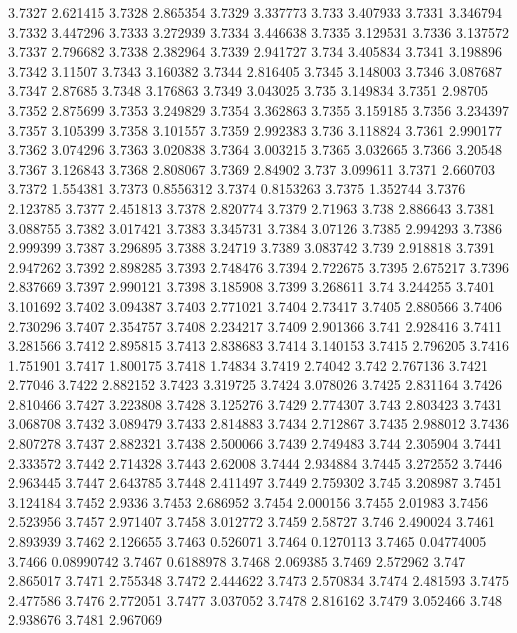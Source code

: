 3.7327  2.621415
3.7328  2.865354
3.7329  3.337773
3.733  3.407933
3.7331  3.346794
3.7332  3.447296
3.7333  3.272939
3.7334  3.446638
3.7335  3.129531
3.7336  3.137572
3.7337  2.796682
3.7338  2.382964
3.7339  2.941727
3.734  3.405834
3.7341  3.198896
3.7342  3.11507
3.7343  3.160382
3.7344  2.816405
3.7345  3.148003
3.7346  3.087687
3.7347  2.87685
3.7348  3.176863
3.7349  3.043025
3.735  3.149834
3.7351  2.98705
3.7352  2.875699
3.7353  3.249829
3.7354  3.362863
3.7355  3.159185
3.7356  3.234397
3.7357  3.105399
3.7358  3.101557
3.7359  2.992383
3.736  3.118824
3.7361  2.990177
3.7362  3.074296
3.7363  3.020838
3.7364  3.003215
3.7365  3.032665
3.7366  3.20548
3.7367  3.126843
3.7368  2.808067
3.7369  2.84902
3.737  3.099611
3.7371  2.660703
3.7372  1.554381
3.7373  0.8556312
3.7374  0.8153263
3.7375  1.352744
3.7376  2.123785
3.7377  2.451813
3.7378  2.820774
3.7379  2.71963
3.738  2.886643
3.7381  3.088755
3.7382  3.017421
3.7383  3.345731
3.7384  3.07126
3.7385  2.994293
3.7386  2.999399
3.7387  3.296895
3.7388  3.24719
3.7389  3.083742
3.739  2.918818
3.7391  2.947262
3.7392  2.898285
3.7393  2.748476
3.7394  2.722675
3.7395  2.675217
3.7396  2.837669
3.7397  2.990121
3.7398  3.185908
3.7399  3.268611
3.74  3.244255
3.7401  3.101692
3.7402  3.094387
3.7403  2.771021
3.7404  2.73417
3.7405  2.880566
3.7406  2.730296
3.7407  2.354757
3.7408  2.234217
3.7409  2.901366
3.741  2.928416
3.7411  3.281566
3.7412  2.895815
3.7413  2.838683
3.7414  3.140153
3.7415  2.796205
3.7416  1.751901
3.7417  1.800175
3.7418  1.74834
3.7419  2.74042
3.742  2.767136
3.7421  2.77046
3.7422  2.882152
3.7423  3.319725
3.7424  3.078026
3.7425  2.831164
3.7426  2.810466
3.7427  3.223808
3.7428  3.125276
3.7429  2.774307
3.743  2.803423
3.7431  3.068708
3.7432  3.089479
3.7433  2.814883
3.7434  2.712867
3.7435  2.988012
3.7436  2.807278
3.7437  2.882321
3.7438  2.500066
3.7439  2.749483
3.744  2.305904
3.7441  2.333572
3.7442  2.714328
3.7443  2.62008
3.7444  2.934884
3.7445  3.272552
3.7446  2.963445
3.7447  2.643785
3.7448  2.411497
3.7449  2.759302
3.745  3.208987
3.7451  3.124184
3.7452  2.9336
3.7453  2.686952
3.7454  2.000156
3.7455  2.01983
3.7456  2.523956
3.7457  2.971407
3.7458  3.012772
3.7459  2.58727
3.746  2.490024
3.7461  2.893939
3.7462  2.126655
3.7463  0.526071
3.7464  0.1270113
3.7465  0.04774005
3.7466  0.08990742
3.7467  0.6188978
3.7468  2.069385
3.7469  2.572962
3.747  2.865017
3.7471  2.755348
3.7472  2.444622
3.7473  2.570834
3.7474  2.481593
3.7475  2.477586
3.7476  2.772051
3.7477  3.037052
3.7478  2.816162
3.7479  3.052466
3.748  2.938676
3.7481  2.967069
